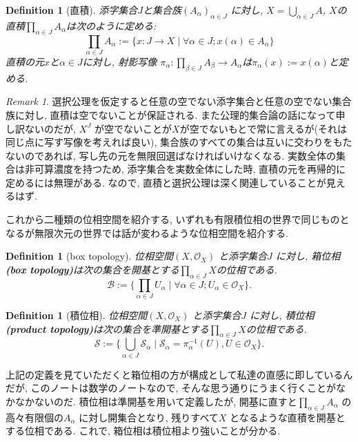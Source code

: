 \documentclass[lualatex]{ltjsbook}
\newtheorem{definition}[theorem]{Definition}
\theoremstyle{remark}
\newtheorem{remark}[theorem]{Remark}
\theoremstyle{plain}
\begin{document}
\begin{definition}[直積]
	添字集合$J$と集合族$\left( A_{\alpha} \right) _{\alpha \in J}$ に対し,   $X=\bigcup_{\alpha \in J} A$,  $X$の直積$\prod_{\alpha \in J}A_{\alpha}$は次のように定める:
	 \[
	\prod_{\alpha \in J}A_{\alpha} :=\{x:J\to X \mid \forall \alpha \in J; x(\alpha) \in A_{\alpha} \} 
	\] 
	直積の元$x$と$\alpha \in J$に対し,  射影写像 $\pi_{\alpha} : \prod_{\beta \in J}A_{\beta} \to A_{\alpha}$は$\pi_{\alpha}(x):= x(\alpha)$と定める.
\end{definition}

\begin{remark}
選択公理を仮定すると任意の空でない添字集合と任意の空でない集合族に対し,  直積は空でないことが保証される. また公理的集合論の話になって申し訳ないのだが,  $X^J$ が空でないことが$X$が空でないもとで常に言えるが(それは同じ点に写す写像を考えれば良い),  集合族のすべての集合は互いに交わりをもたないのであれば,  写し先の元を無限回選ばなければいけなくなる. 実数全体の集合は非可算濃度を持つため,  添字集合を実数全体にした時,  直積の元を再帰的に定めるには無理がある. なので,  直積と選択公理は深く関連していることが見えるはず.
\end{remark}

これから二種類の位相空間を紹介する,  いずれも有限積位相の世界で同じものとなるが無限次元の世界では話が変わるような位相空間を紹介する.

\begin{definition}[box topology]
	位相空間$\left( X, \mathcal{O}_X \right) $ と添字集合$J$ に対し,  箱位相 \textbf{(box topology)}は次の集合を開基とする$\prod_{\alpha \in J}X$の位相である. 
	 \[
	\mathcal{B}:=\{\prod_{\alpha \in J}U_{\alpha}  \mid \forall \alpha \in J; U_{\alpha} \in \mathcal{O}_X\} 
	.\] 
\end{definition}

\begin{definition}[積位相]

	位相空間$\left( X, \mathcal{O}_X \right) $ と添字集合$J$ に対し,  積位相 \textbf{(product topology)}は次の集合を準開基とする$\prod_{\alpha \in J}X$の位相である. 
	\[
	\mathcal{S}:=\{\bigcup_{\alpha \in J}\mathcal{S}_{\alpha} \mid \mathcal{S}_{\alpha}= \pi_{\alpha}^{-1} \left( U \right)  ,  U \in \mathcal{O}_X \} 
	.\] 
\end{definition}

上記の定義を見ていただくと箱位相の方が構成として私達の直感に即しているんだが,  このノートは数学のノートなので,  そんな思う通りにうまく行くことがなかなかないのだ.
積位相は準開基を用いて定義したが,  開基に直すと$\prod_{\alpha \in J} A_{\alpha}  $ の高々有限個の$A_{\alpha}$ に対し開集合となり,  残りすべて$X$ となるような直積を開基とする位相である. 
これで,  箱位相は積位相より強いことが分かる. 
\end{document}

